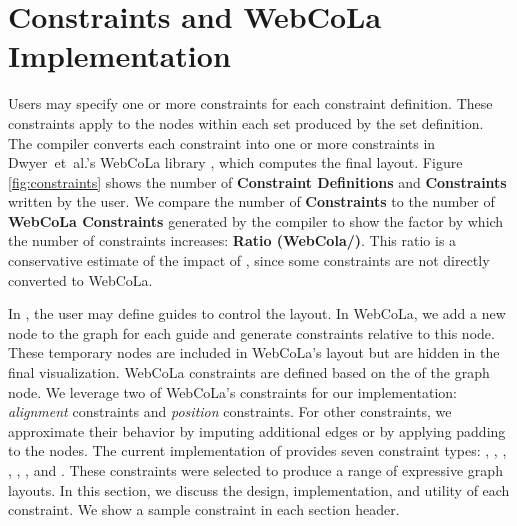 \vspace{-5px}
\section{\projectname Constraints and WebCoLa Implementation}
\label{sec:constraints}
Users may specify one or more constraints for each constraint definition.
These constraints apply to the nodes within each set produced by the set definition.
The \projectname compiler converts each \projectname constraint into one or more
constraints in Dwyer~et~al.'s WebCoLa library \cite{WebCoLa}, which computes
the final layout. Figure \ref{fig:constraints} shows the number
of \textbf{Constraint Definitions} and \textbf{\projectname Constraints} written
by the user. We compare the number of \textbf{\projectname Constraints} to
the number of \textbf{WebCoLa Constraints} generated by the \projectname compiler
to show the factor by which the number of constraints increases: \textbf{Ratio
(WebCola/\projectname)}. This ratio is a conservative estimate of the
impact of \projectname, since some \projectname constraints are not
directly converted to WebCoLa.

In \projectname, the user may define guides to control the layout.
In WebCoLa, we add a new node to the graph for each guide and generate 
constraints relative to this node. These temporary nodes are included in 
WebCoLa's layout but are hidden in the final visualization.
WebCoLa constraints are defined based on the  of the graph 
node. We leverage two of WebCoLa's constraints for our implementation: 
\emph{alignment} constraints and \emph{position} constraints. For other \projectname constraints, we
approximate their behavior by imputing additional edges or by applying
padding to the nodes. The current implementation of
\projectname provides seven constraint types:
, , , ,
, , and . These constraints
were selected to produce a range of expressive
graph layouts. In this section, we discuss the design, implementation, 
and utility of each \projectname constraint. We show 
a sample \projectname constraint in each section header.


